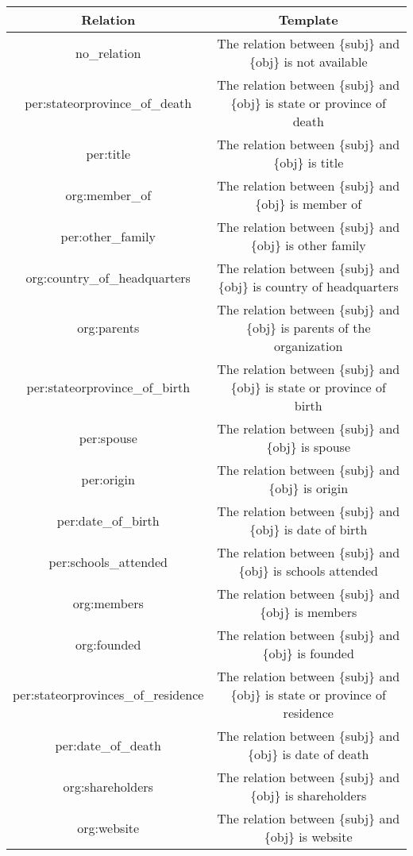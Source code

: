 \begin{table*}[h]
    \centering
    \begin{threeparttable}
    \small
    \begin{tabular}{cc}
    \toprule
    Relation & Template \\
    \midrule
    no\_relation &     The relation between \{subj\} and \{obj\} is not available\\
    per:stateorprovince\_of\_death &     The relation between \{subj\} and \{obj\} is state or province of death\\
    per:title &     The relation between \{subj\} and \{obj\} is title\\
    org:member\_of &     The relation between \{subj\} and \{obj\} is member of\\
    per:other\_family &     The relation between \{subj\} and \{obj\} is other family\\
    org:country\_of\_headquarters &     The relation between \{subj\} and \{obj\} is country of headquarters\\
    org:parents &     The relation between \{subj\} and \{obj\} is parents of the organization\\
    per:stateorprovince\_of\_birth &     The relation between \{subj\} and \{obj\} is state or province of birth\\
    per:spouse &     The relation between \{subj\} and \{obj\} is spouse\\
    per:origin &     The relation between \{subj\} and \{obj\} is origin\\
    per:date\_of\_birth &     The relation between \{subj\} and \{obj\} is date of birth\\
    per:schools\_attended &     The relation between \{subj\} and \{obj\} is schools attended\\
    org:members &     The relation between \{subj\} and \{obj\} is members\\
    org:founded &     The relation between \{subj\} and \{obj\} is founded\\
    per:stateorprovinces\_of\_residence &     The relation between \{subj\} and \{obj\} is state or province of residence\\
    per:date\_of\_death &     The relation between \{subj\} and \{obj\} is date of death\\
    org:shareholders &     The relation between \{subj\} and \{obj\} is shareholders\\
    org:website &     The relation between \{subj\} and \{obj\} is website\\

\end{tabular}
\end{threeparttable}
\end{table*}
